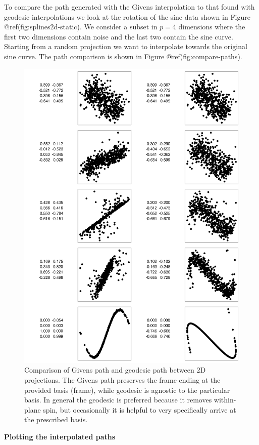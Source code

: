 \documentclass[
]{article}
\begin{document}
To compare the path generated with the Givens interpolation to that
found with geodesic interpolations we look at the rotation of the sine
data shown in Figure @ref(fig:splines2d-static). We consider a subset in
\(p=4\) dimensions where the first two dimensions contain noise and the
last two contain the sine curve. Starting from a random projection we
want to interpolate towards the original sine curve. The path comparison
is shown in Figure @ref(fig:compare-paths).

\begin{figure}

{\centering \includegraphics[width=0.8\linewidth]{figures/compare-paths} 

}

\caption{Comparison of Givens path and geodesic path between 2D projections. The Givens path preserves the frame ending at the provided basis (frame), while geodesic is agnostic to the particular basis. In general the geodesic is preferred because it removes within-plane spin, but occasionally it is helpful to very specifically arrive at the prescribed basis.}\label{fig:compare-paths}
\end{figure}

\textbf{Plotting the interpolated paths}
\end{document}

